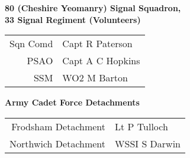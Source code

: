 \pagebreak

\vspace*{10mm}

\begin{center}
  \Large
  \textbf{80 (Cheshire Yeomanry) Signal Squadron, \\ 33 Signal Regiment (Volunteers)}
\end{center}

\begin{center}
  \begin{tabular}{rl}
    Sqn Comd & Capt R Paterson \\
    PSAO & Capt A C Hopkins \\
    SSM & WO2 M Barton \\
  \end{tabular}
\end{center}

\vspace*{10mm}

\begin{center}
  \Large
  \textbf{Army Cadet Force Detachments}
\end{center}

\begin{center}
  \begin{tabular}{rl}
    Frodsham Detachment & Lt P Tulloch \\
    Northwich Detachment & WSSI S Darwin \\
  \end{tabular}
\end{center}
